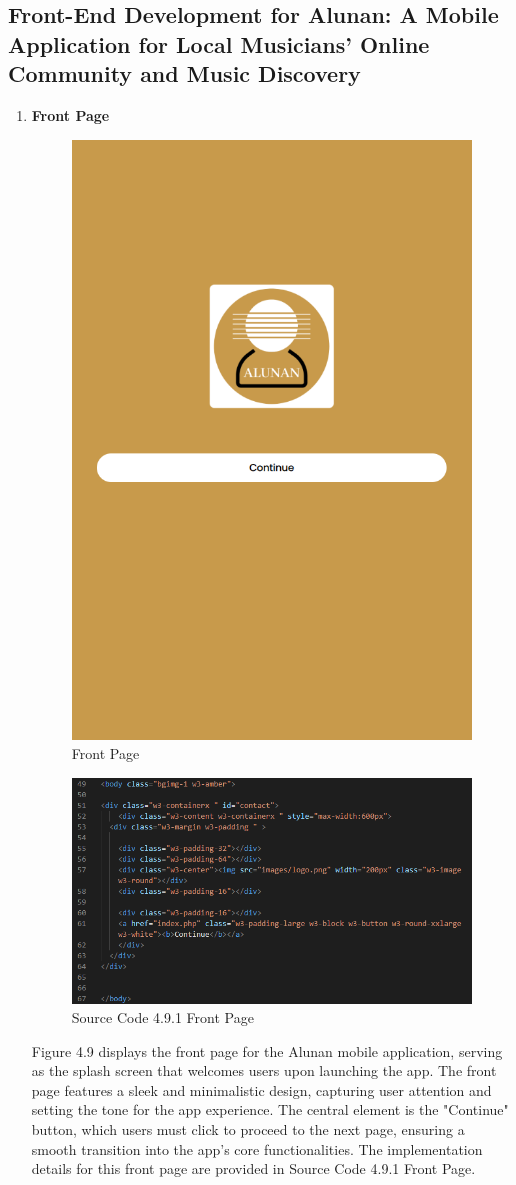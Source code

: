 \subsection{Front-End Development for Alunan: A Mobile Application for Local Musicians’ Online Community and Music Discovery}
\begin{enumerate}[1.]
    \item \textbf{Front Page} \\
    \begin{figure}[h]
        \centering
        \includegraphics[width=0.5\linewidth]{mainmatter/images/frontend/ss/Front Page.png}
        \caption{Front Page}
        \label{fig:myfig48}
    \end{figure}
    \begin{figure}[h]
        \centering
        \includegraphics[width=0.7\linewidth]{mainmatter/images/frontend/code/frontpage.png}
        \caption*{Source Code 4.9.1 Front Page}
        \label{fig:myfig48a}
    \end{figure}
    \clearpage
    Figure 4.9 displays the front page for the Alunan mobile application, serving as the splash screen that welcomes users upon launching the app. The front page features a sleek and minimalistic design, capturing user attention and setting the tone for the app experience. The central element is the "Continue" button, which users must click to proceed to the next page, ensuring a smooth transition into the app's core functionalities. The implementation details for this front page are provided in Source Code 4.9.1 Front Page.


\end{enumerate}
